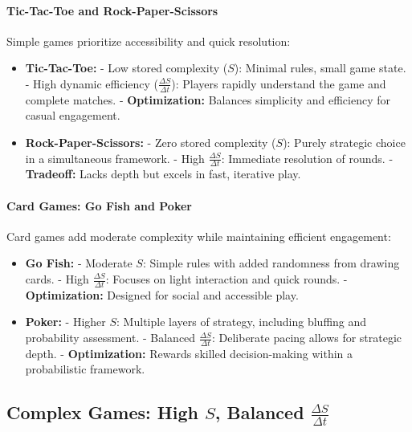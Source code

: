 \documentclass[12pt]{article}
\begin{document}
\paragraph{Tic-Tac-Toe and Rock-Paper-Scissors}
Simple games prioritize accessibility and quick resolution:
\begin{itemize}
    \item \textbf{Tic-Tac-Toe:}
        - Low stored complexity (\(S\)): Minimal rules, small game state.
        - High dynamic efficiency (\(\frac{\Delta S}{\Delta t}\)): Players rapidly understand the game and complete matches.
        - \textbf{Optimization:} Balances simplicity and efficiency for casual engagement.
    \item \textbf{Rock-Paper-Scissors:}
        - Zero stored complexity (\(S\)): Purely strategic choice in a simultaneous framework.
        - High \(\frac{\Delta S}{\Delta t}\): Immediate resolution of rounds.
        - \textbf{Tradeoff:} Lacks depth but excels in fast, iterative play.
\end{itemize}

\paragraph{Card Games: Go Fish and Poker}
Card games add moderate complexity while maintaining efficient engagement:
\begin{itemize}
    \item \textbf{Go Fish:} 
        - Moderate \(S\): Simple rules with added randomness from drawing cards.
        - High \(\frac{\Delta S}{\Delta t}\): Focuses on light interaction and quick rounds.
        - \textbf{Optimization:} Designed for social and accessible play.
    \item \textbf{Poker:} 
        - Higher \(S\): Multiple layers of strategy, including bluffing and probability assessment.
        - Balanced \(\frac{\Delta S}{\Delta t}\): Deliberate pacing allows for strategic depth.
        - \textbf{Optimization:} Rewards skilled decision-making within a probabilistic framework.
\end{itemize}

\subsection{Complex Games: High \(S\), Balanced \(\frac{\Delta S}{\Delta t}\)}
\end{document}
